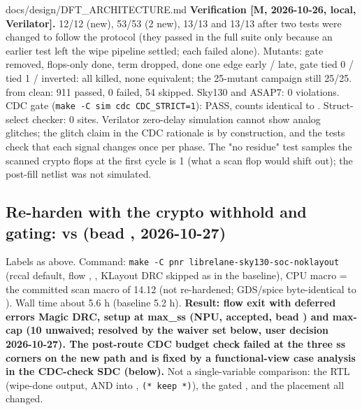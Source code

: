 \begin{relocated}{docs/design/DFT_ARCHITECTURE.md}
\textbf{Verification {[}M, 2026-10-26, local, Verilator{]}.}
 12/12 (new),  53/53 (2
new),  13/13 and  13/13 after two
tests were changed to follow the protocol (they passed in the full suite
only because an earlier test left the wipe pipeline settled; each failed
alone). Mutants: gate removed, flops-only done,  term
dropped, done one edge early / late, gate tied 0 / tied 1 / inverted:
all killed, none equivalent; the 25-mutant  campaign still
25/25.  from clean: 911 passed, 0 failed, 54 skipped.
 Sky130 and ASAP7: 0 violations. CDC gate
(\texttt{make\ -\allowbreak{}C\ sim\ cdc\ CDC\_\allowbreak{}STRICT=\allowbreak{}1}):
PASS, counts identical to . Struct-select checker: 0
sites. Verilator zero-delay simulation cannot show analog glitches; the
glitch claim in the CDC rationale is by construction, and the tests
check that each signal changes once per phase. The "no residue" test
samples the scanned crypto flops at the first cycle 
is 1 (what a scan flop would shift out); the post-fill netlist was not
simulated.

\subsection{\texorpdfstring{Re-harden with the crypto
 withhold and  gating:
 vs  (bead
,
2026-10-27)}{Re-harden with the crypto  withhold and  gating:  vs  (bead , 2026-10-27)}}\label{tm:ch:dft-architecture:14141-re-harden-with-the-crypto-scan-en-withhold-and-scan-out-o-gating-run-2026-10-27-05-40-27-vs-run-2026-10-26-09-59-03-bead-j41m17-2026-10-27}

Labels as above. Command:
\texttt{make\ -\allowbreak{}C\ pnr\ librelane-\allowbreak{}sky130-\allowbreak{}soc-\allowbreak{}noklayout}
(rccal default, flow , ,
KLayout DRC skipped as in the baseline), CPU macro = the committed scan
macro of 14.12 (not re-hardened; GDS/spice byte-identical to
). Wall time about 5.6 h (baseline 5.2 h).
\textbf{Result: flow exit with deferred errors Magic DRC, setup at
max\_ss (NPU, accepted, bead ) and max-cap (10 unwaived;
resolved by the waiver set below, user decision 2026-10-27). The
post-route CDC budget check failed at the three ss corners on the new
path and is fixed by a functional-view case analysis in the CDC-check
SDC (below).} Not a single-variable comparison: the RTL (wipe-done
output, AND into , \texttt{(*\ keep\ *)}), the gated
, and the placement all changed.


\end{relocated}
